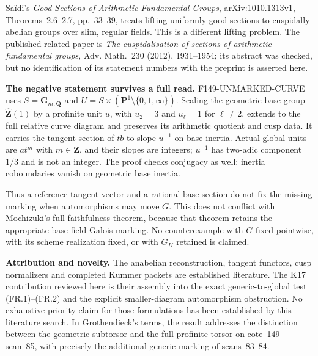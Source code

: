 \documentclass[11pt,a4paper]{article}
\theoremstyle{definition}
\renewcommand{\paragraph}[1]{\par\smallskip\noindent\textbf{#1}\quad\ignorespaces}
\begin{document}
Sa\"idi's \emph{Good Sections of Arithmetic Fundamental
Groups}, arXiv:1010.1313v1, Theorems~2.6--2.7,
pp.~33--39, treats lifting uniformly good sections to
cuspidally abelian groups over slim, regular fields.
This is a different lifting problem. The published related
paper is \emph{The cuspidalisation of sections of arithmetic
fundamental groups}, Adv. Math.~230 (2012), 1931--1954;
its abstract was checked, but no identification of its
statement numbers with the preprint is asserted here.

\paragraph{The negative statement survives a full read.}
F149-UNMARKED-CURVE uses
$S=\mathbf G_{m,\mathbf Q}$ and
$U=S\times(\mathbf P^1\setminus\{0,1,\infty\})$.
Scaling the geometric base group
$\widehat{\mathbf Z}(1)$ by a profinite unit $u$, with
$u_2=3$ and $u_\ell=1$ for $\ell\ne2$, extends to the
full relative curve diagram and preserves its arithmetic
quotient and cusp data. It carries the tangent section of
$t b$ to slope $u^{-1}$ on base inertia. Actual global units
are $a t^m$ with $m\in\mathbf Z$, and their slopes are
integers; $u^{-1}$ has two-adic component $1/3$ and is not
an integer. The proof checks conjugacy as well: inertia
coboundaries vanish on geometric base inertia.

Thus a reference tangent vector and a rational base section
do not fix the missing marking when automorphisms may move
$G$. This does not conflict with Mochizuki's full-faithfulness
theorem, because that theorem retains the appropriate base
field Galois marking. No counterexample with $G$ fixed
pointwise, with its scheme realization fixed, or with $G_K$
retained is claimed.

\paragraph{Attribution and novelty.}
The anabelian reconstruction, tangent functors, cusp
normalizers and completed Kummer packets are established
literature. The K17 contribution reviewed here is their
assembly into the exact generic-to-global test (FR.1)--(FR.2)
and the explicit smaller-diagram automorphism obstruction.
No exhaustive priority claim for those formulations has
been established by this literature search. In Grothendieck's
terms, the result addresses the distinction between the
geometric subtorsor and the full profinite torsor on
cote~149 scan~85, with precisely the additional generic
marking of scans~83--84.
\end{document}
